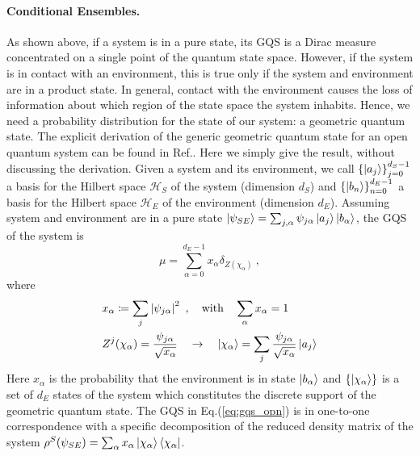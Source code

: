 \documentclass[%
 reprint,
 superscriptaddress,
 aps,
 pra,
]{revtex4-2}
\theoremstyle{definition}
\begin{document}
\paragraph*{Conditional Ensembles.}
As shown above, if a system is in a pure state, its GQS is a Dirac measure concentrated
on a single point of the quantum state space. However, if the system is in contact with an environment, 
this is true only if the system and environment are in a product state. In general, contact with 
the environment causes the loss of information about which region of the state space the system inhabits. 
Hence, we need a probability distribution for the state of our system: a geometric quantum state. The explicit 
derivation of the generic geometric quantum state for an open quantum system can be found 
in Ref.\cite{Anza2021DensityMatricesGeometric}. Here we simply give the result, without discussing the derivation. 
Given a system and its environment, we call $\left\{ \ket{a_j}\right\}_{j=0}^{d_S-1}$ a basis for 
the Hilbert space $\mathcal{H}_S$ of the system (dimension $d_S$) and 
$\left\{ \ket{b_n}\right\}_{n=0}^{d_E-1}$ a basis for the Hilbert space $\mathcal{H}_E$ 
of the environment (dimension $d_E$). Assuming system and environment are in 
a pure state $\ket{\psi_{SE}} = \sum_{j,\alpha}\psi_{j\alpha}\ket{a_j}\ket{b_\alpha}$, the 
GQS of the system is
\begin{equation}
\mu = \sum_{\alpha=0}^{d_E-1} x_\alpha \delta_{Z(\chi_\alpha)}~,\label{eq:gqs_opn}
\end{equation}
where 
\begin{subequations}\label{eq:def_xchi}
\begin{align}
&x_\alpha \coloneqq \sum_j \left\vert \psi_{j\alpha}\right\vert^2~, \quad \mathrm{with} \quad \sum_\alpha x_\alpha =1\\
&Z^j(\chi_\alpha) = \frac{\psi_{j\alpha}}{\sqrt{x_\alpha}}\quad \to \quad \ket{\chi_\alpha} = \sum_j \frac{\psi_{j\alpha}}{\sqrt{x_\alpha}}\ket{a_j}
\end{align}\label{eq:xgammas}
\end{subequations}
Here $x_\alpha$ is the probability that the environment is in state $\ket{b_\alpha}$ and $\left\{\ket{\chi_\alpha}\right\}$ 
is a set of $d_E$ states of the system which constitutes the discrete support of the geometric 
quantum state. The GQS in Eq.(\ref{eq:gqs_opn}) is in one-to-one correspondence with a specific decomposition
of the reduced density matrix of the system
$\rho^{S}(\psi_{SE}) = \sum_\alpha x_\alpha \ket{\chi_\alpha}\bra{\chi_\alpha}$.
\end{document}
